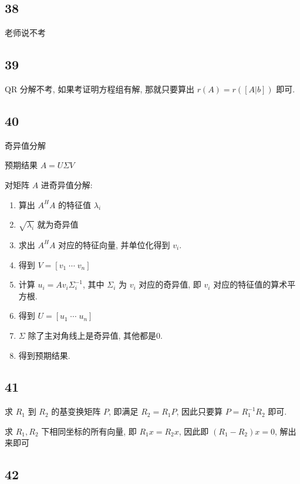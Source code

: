 \documentclass[a4paper, draft]{article}
\begin{document}
\subsection*{38}

老师说不考

\subsection*{39}

$\text{QR}$ 分解不考, 如果考证明方程组有解, 
那就只要算出 $r(A)=r([A|b])$ 即可.

\subsection*{40}

奇异值分解

预期结果 $A=U\Sigma V$

对矩阵 $A$ 进奇异值分解: 

\begin{enumerate}
    \item 算出 $A^{H}A$ 的特征值 $\lambda_i$
    \item $\sqrt{\lambda_i}$ 就为奇异值
    \item 求出 $A^{H}A$ 对应的特征向量, 并单位化得到 $v_i$.
    \item 得到 $V=[v_1\;\cdots\;v_n]$
    \item 计算 $u_i=Av_i\Sigma_i^{-1}$, 
    其中 $\Sigma_i$ 为 $v_i$ 对应的奇异值, 
    即 $v_i$ 对应的特征值的算术平方根.
    \item 得到 $U=[u_1\;\cdots\;u_n]$
    \item $\Sigma$ 除了主对角线上是奇异值, 其他都是0.
    \item 得到预期结果.
\end{enumerate}

\subsection*{41}

求 $R_1$ 到 $R_2$ 的基变换矩阵 $P$, 即满足  $R_2=R_1P$, 
因此只要算 $P=R_1^{-1}R_2$ 即可.

求 $R_1,R_2$ 下相同坐标的所有向量, 即 $R_1x=R_2x$, 
因此即 $(R_1-R_2)x=0$, 解出来即可


\subsection*{42}
\end{document}
